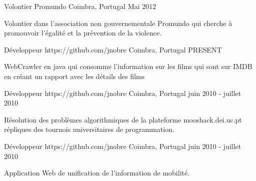 


\begin{cventries}


\cventry
{Volontier} %
{Promundo} %
{Coimbra, Portugal} %
{Mai 2012} %
{ %
\begin{cvitems}
\item {Volontier dans l’association non gouvernementale Promundo qui cherche à promouvoir l'égalité et la prévention de la violence. }
\end{cvitems}
}


\cventry
{Développeur} %
{https://github.com/jnobre} %
{Coimbra, Portugal} %
{ PRESENT} %
{ %
\begin{cvitems}
\item {WebCrawler en java qui consomme l’information sur les films qui sont sur IMDB en créant un rapport avec les détails des films}
\end{cvitems}
}


\cventry
{Développeur} %
{https://github.com/jnobre} %
{Coimbra, Portugal} %
{juin 2010 - juillet 2010} %
{ %
\begin{cvitems}
\item {Résolution des problèmes algorithmiques de la plateforme mooshack.dei.uc.pt répliques des tournois universitaires de programmation.}
\end{cvitems}
}


\cventry
{Développeur} %
{https://github.com/jnobre} %
{Coimbra, Portugal} %
{juin 2010 - juillet 2010} %
{ %
\begin{cvitems}
\item {Application Web de unification de l’information de mobilité.}
\end{cvitems}
}


\end{cventries}